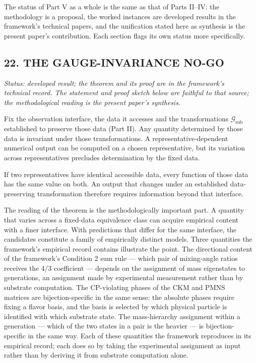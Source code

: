 \documentclass[
]{article}
\begin{document}
The status of Part V as a whole is the same as that of Parts II--IV: the
methodology is a proposal, the worked instances are developed results in
the framework's technical papers, and the unification stated here as
synthesis is the present paper's contribution. Each section flags its
own status more specifically.

\hypertarget{the-gauge-invariance-no-go}{%
\subsection{22. THE GAUGE-INVARIANCE
NO-GO}\label{the-gauge-invariance-no-go}}

\emph{Status: developed result; the theorem and its proof are in the
framework's technical record. The statement and proof sketch below are
faithful to that source; the methodological reading is the present
paper's synthesis.}

Fix the observation interface, the data it accesses and the
transformations \(\mathcal{G}_{\text{sub}}\) established to preserve
those data (Part II). Any quantity determined by those data is invariant
under those transformations. A representative-dependent numerical output
can be computed on a chosen representative, but its variation across
representatives precludes determination by the fixed data.

If two representatives have identical accessible data, every function of
those data has the same value on both. An output that changes under an
established data-preserving transformation therefore requires
information beyond that interface.

The reading of the theorem is the methodologically important part. A
quantity that varies across a fixed-data equivalence class can acquire
empirical content with a finer interface. With predictions that differ
for the same interface, the candidates constitute a family of
empirically distinct models. Three quantities the framework's empirical
record contains illustrate the point. The directional content of the
framework's Condition 2 sum rule --- which pair of mixing-angle ratios
receives the 4/3 coefficient --- depends on the assignment of mass
eigenstates to generations, an assignment made by experimental
measurement rather than by substrate computation. The CP-violating
phases of the CKM and PMNS matrices are bijection-specific in the same
sense: the absolute phases require fixing a flavor basis, and the basis
is selected by which physical particle is identified with which
substrate state. The mass-hierarchy assignment within a generation ---
which of the two states in a pair is the heavier --- is
bijection-specific in the same way. Each of these quantities the
framework reproduces in its empirical record; each does so by taking the
experimental assignment as input rather than by deriving it from
substrate computation alone.
\end{document}
